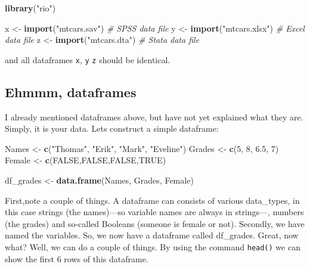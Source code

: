 \documentclass[]{article}
\newenvironment{Shaded}{\begin{snugshade}}{\end{snugshade}}
\newcommand{\KeywordTok}[1]{\textcolor[rgb]{0.13,0.29,0.53}{\textbf{#1}}}
\newcommand{\DecValTok}[1]{\textcolor[rgb]{0.00,0.00,0.81}{#1}}
\newcommand{\FloatTok}[1]{\textcolor[rgb]{0.00,0.00,0.81}{#1}}
\newcommand{\StringTok}[1]{\textcolor[rgb]{0.31,0.60,0.02}{#1}}
\newcommand{\CommentTok}[1]{\textcolor[rgb]{0.56,0.35,0.01}{\textit{#1}}}
\newcommand{\OtherTok}[1]{\textcolor[rgb]{0.56,0.35,0.01}{#1}}
\newcommand{\NormalTok}[1]{#1}
\theoremstyle{definition}
\theoremstyle{definition}
\theoremstyle{definition}
\theoremstyle{remark}
\begin{document}
\begin{Shaded}
\begin{Highlighting}[]
\KeywordTok{library}\NormalTok{(}\StringTok{"rio"}\NormalTok{)}

\NormalTok{x <-}\StringTok{ }\KeywordTok{import}\NormalTok{(}\StringTok{"mtcars.sav"}\NormalTok{)  }\CommentTok{# SPSS data file}
\NormalTok{y <-}\StringTok{ }\KeywordTok{import}\NormalTok{(}\StringTok{"mtcars.xlsx"}\NormalTok{) }\CommentTok{# Excel data file}
\NormalTok{z <-}\StringTok{ }\KeywordTok{import}\NormalTok{(}\StringTok{"mtcars.dta"}\NormalTok{)  }\CommentTok{# Stata data file}
\end{Highlighting}
\end{Shaded}

and all dataframes \texttt{x}, \texttt{y} \texttt{z} should be
identical.

\subsection{Ehmmm, dataframes}\label{ehmmm-dataframes}

I already mentioned dataframes above, but have not yet explained what
they are. Simply, it is your data. Lets construct a simple dataframe:

\begin{Shaded}
\begin{Highlighting}[]
\NormalTok{Names  <-}\StringTok{ }\KeywordTok{c}\NormalTok{(}\StringTok{"Thomas"}\NormalTok{, }\StringTok{"Erik"}\NormalTok{, }\StringTok{"Mark"}\NormalTok{, }\StringTok{"Eveline"}\NormalTok{)}
\NormalTok{Grades <-}\StringTok{ }\KeywordTok{c}\NormalTok{(}\DecValTok{5}\NormalTok{, }\DecValTok{8}\NormalTok{, }\FloatTok{6.5}\NormalTok{, }\DecValTok{7}\NormalTok{)}
\NormalTok{Female <-}\StringTok{ }\KeywordTok{c}\NormalTok{(}\OtherTok{FALSE}\NormalTok{,}\OtherTok{FALSE}\NormalTok{,}\OtherTok{FALSE}\NormalTok{,}\OtherTok{TRUE}\NormalTok{)}

\NormalTok{df_grades <-}\StringTok{ }\KeywordTok{data.frame}\NormalTok{(Names, Grades, Female) }
\end{Highlighting}
\end{Shaded}

First,note a couple of things. A dataframe can consists of various
data\_types, in this case strings (the names)---so variable names are
always in strings---, numbers (the grades) and so-called Booleans
(someone is female or not). Secondly, we have named the variables. So,
we now have a dataframe called df\_grades. Great, now what? Well, we can
do a couple of things. By using the command \texttt{head()} we can show
the first 6 rows of this dataframe.
\end{document}
